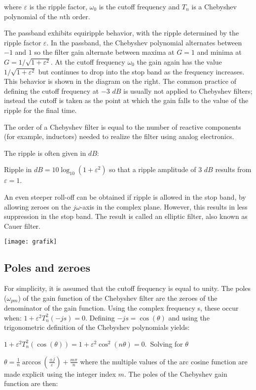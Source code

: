 \documentclass[journal abbreviation, manuscript]{copernicus}
\begin{document}
where $\varepsilon$ is the ripple factor, $\omega_0$ is the cutoff frequency and $T_n$ is a Chebyshev polynomial of the $n$th order.

The passband exhibits equiripple behavior, with the ripple determined by the ripple factor $\varepsilon$. In the passband, the Chebyshev polynomial alternates between $ -1 $ and $ 1 $ so the filter gain alternate between maxima at $G = 1$ and minima at $G=1/\sqrt{1+\varepsilon^2}$. At the cutoff frequency $\omega_0$ the gain again has the value $1/\sqrt{1+\varepsilon^2}$ but continues to drop into the stop band as the frequency increases. This behavior is shown in the diagram on the right. The common practice of defining the cutoff frequency at $ -3 $ $dB$ is usually not applied to Chebyshev filters; instead the cutoff is taken as the point at which the gain falls to the value of the ripple for the final time.

The order of a Chebyshev filter is equal to the number of reactive components (for example, inductors) needed to realize the filter using analog electronics.

The ripple is often given in $dB$:

Ripple in $dB = 10 \log_{10}(1+\varepsilon^2)$
so that a ripple amplitude of 3 $dB$ results from $\varepsilon = 1$.

An even steeper roll-off can be obtained if ripple is allowed in the stop band, by allowing zeroes on the $j\omega$-axis in the complex plane. However, this results in less suppression in the stop band. The result is called an elliptic filter, also known as Cauer filter. 

\texttt{[image: grafik]}

\subsection{Poles and zeroes}
For simplicity, it is assumed that the cutoff frequency is equal to unity. The poles ($\omega_{pm}$) of the gain function of the Chebyshev filter are the zeroes of the denominator of the gain function. Using the complex frequency s, these occur when:
$1+\varepsilon^2T_n^2(-js)=0.$
Defining $-js=\cos(\theta)$ and using the trigonometric definition of the Chebyshev polynomials yields:

$1+\varepsilon^2T_n^2(\cos(\theta))=1+\varepsilon^2\cos^2(n\theta)=0.$\,
Solving for $\theta$

$\theta=\frac{1}{n}\arccos\left(\frac{\pm j}{\varepsilon}\right)+\frac{m\pi}{n}$
where the multiple values of the arc cosine function are made explicit using the integer index $m$. The poles of the Chebyshev gain function are then:
\end{document}
